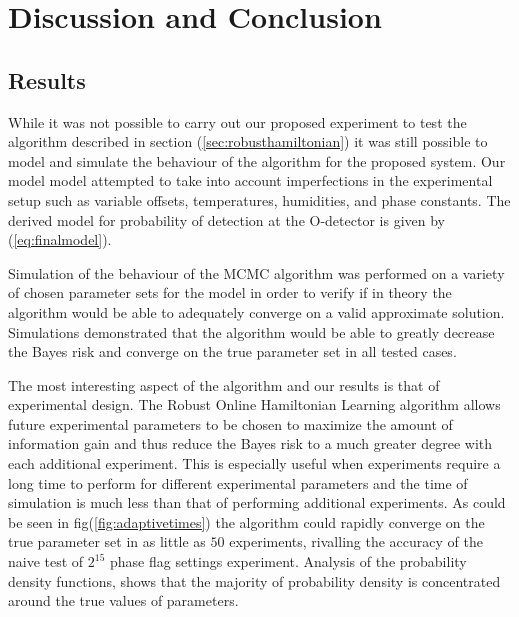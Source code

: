
\chapter{Discussion and Conclusion} %
\label{Chapter5}

\section{Results}
While it was not possible to carry out our proposed experiment to test the algorithm described in section (\ref{sec:robusthamiltonian}) it was still possible to model and simulate the behaviour of the algorithm for the proposed system. Our model model attempted to take into account imperfections in the experimental setup such as variable offsets, temperatures, humidities, and phase constants. The derived model for probability of detection at the O-detector is given by (\ref{eq:finalmodel}).

Simulation of the behaviour of the MCMC algorithm was performed on a variety of chosen parameter sets for the model in order to verify if in theory the algorithm would be able to adequately converge on a valid approximate solution. Simulations demonstrated that the algorithm would be able to greatly decrease the Bayes risk and converge on the true parameter set in all tested cases.   

The most interesting aspect of the algorithm and our results is that of experimental design. The Robust Online Hamiltonian Learning algorithm allows future experimental parameters to be chosen to maximize the amount of information gain and thus reduce the Bayes risk to a much greater degree with each additional experiment. This is especially useful when experiments require a long time to perform for different experimental parameters and the time of simulation is much less than that of performing additional experiments. As could be seen in fig(\ref{fig:adaptivetimes}) the algorithm could rapidly converge on the true parameter set in as little as $50$ experiments, rivalling the accuracy of the naive test of $2^15$ phase flag settings experiment. Analysis of the probability density functions, shows that the majority of probability density is concentrated around the true values of parameters. 

